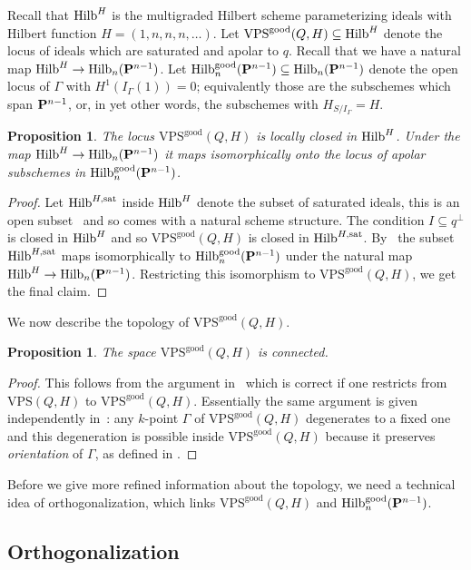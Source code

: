 \documentclass{amsart}
\newcommand{\Hilb}{{\rm{Hilb}}}
\newcommand{\PP}{{\bf P}}
\newcommand{\Hgood}{\Hilb^{\rm{good}}_{n}(\PP^{n-1})}
\newcommand{\VPSgood}{{\mathrm{VPS}}^{\mathrm{good}}(Q, H)}
\newcommand{\VPS}{\mathrm{VPS}(Q, H)}
\newcommand{\sat}{\mathrm{sat}}%
\newtheorem{proposition}[lemma]{\bf Proposition}
\begin{document}
Recall that $\Hilb^H$ is the multigraded Hilbert scheme parameterizing ideals with Hilbert function $H = (1,n,n,n, \ldots )$.
Let
$\VPSgood\subseteq \Hilb^H$ denote the locus of ideals which are saturated and
apolar to $q$. Recall that we have a natural map $\Hilb^H\to
\Hilb_n(\PP^{n-1})$.
Let $\Hgood\subseteq \Hilb_n(\PP^{n-1})$ denote the open
locus of $\Gamma$ with $H^1(I_{\Gamma}(1)) = 0$; equivalently those are the
subschemes which span $\PP^{n-1}$, or, in yet other words, the subschemes
with $H_{S/I_{\Gamma}} = H$.
\begin{proposition}\label{ref:twoEmbeddings:prop}
    The locus $\VPSgood$ is locally closed in $\Hilb^H$. Under the map
    $\Hilb^H\to \Hilb_{n}(\PP^{n-1})$ it maps isomorphically onto the
    locus of apolar subschemes in $\Hgood$.
\end{proposition}
\begin{proof}
    Let $\Hilb^{H, \sat}$ inside $\Hilb^H$ denote the subset of saturated ideals,
    this is an open subset~\cite[Theorem~2.6]{JM} and so comes with a natural scheme structure.
    The condition $I\subseteq q^\perp$ is closed in $\Hilb^H$ and so
    $\VPSgood$ is closed in $\Hilb^{H,\sat}$.
    By~\cite[Theorem~3.9]{JM} the subset
    $\Hilb^{H, \sat}$ maps isomorphically to $\Hgood$ under the natural map
    $\Hilb^H\to \Hilb_n(\PP^{n-1})$. Restricting this isomorphism to
    $\VPSgood$, we get the final claim.
\end{proof}

We now describe the topology of $\VPSgood$.
\begin{proposition}\label{connectednessOfVPSgood}
    The space $\VPSgood$ is connected.
\end{proposition}

\begin{proof}
    This follows from the argument in~\cite[Section~6]{RS} which is correct
    if one restricts from $\VPS$ to $\VPSgood$.
    Essentially the same argument is given independently
    in~\cite[Proposition~4.1]{hoyois2021hermitian}: any $k$-point $\Gamma$ of
    $\VPSgood$ degenerates to a fixed one and this degeneration is possible
    inside $\VPSgood$ because it preserves \emph{orientation} of $\Gamma$, as
    defined in \cite[2.1]{hoyois2021hermitian}.
\end{proof}

Before we give more refined information about the topology, we need a
technical idea of orthogonalization, which links $\VPSgood$ and $\Hgood$.
\subsection{Orthogonalization}
\end{document}
